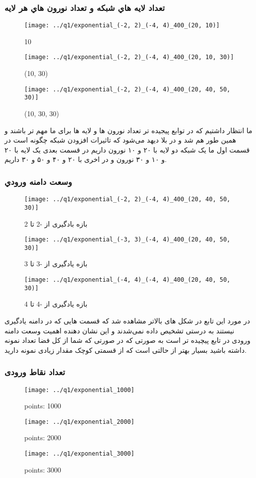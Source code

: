 \documentclass[a4paper,12pt]{article}
\begin{document}
 \subsubsection{تعداد لایه هاي شبکه و تعداد نورون هاي هر لایه}
\begin{figure}[!htb]
  \texttt{[image: ../q1/exponential\_(-2, 2)\_(-4, 4)\_400\_(20, 10)]}
  \caption{10}
\endminipage\hfill
{}
  \texttt{[image: ../q1/exponential\_(-2, 2)\_(-4, 4)\_400\_(20, 10, 30)]}
  \caption{(10, 30)}
\endminipage\hfill
{}
  \texttt{[image: ../q1/exponential\_(-2, 2)\_(-4, 4)\_400\_(20, 40, 50, 30)]}
  \caption{(10, 30, 30)}
\endminipage\hfill
\end{figure}
ما انتظار داشتیم که در توابع پیجیده تر تعداد نورون ها و لایه ها برای ما مهم تر باشند و همین طور هم شد و در بلا دیهد می‌شود که تاثیرات افزودن شبکه چگونه است در قسمت اول ما یک شبکه دو لایه با ۲۰ و ۱۰ نورون داریم در قسمت بعدی یک لایه با  ۲۰ و ۱۰ و ۳۰ نورون و در اخری با ۲۰ و ۴۰ و ۵۰ و ۳۰ داریم.


\newpage
\subsubsection{وسعت دامنه ورودي }
\begin{figure}[!htb]
  \texttt{[image: ../q1/exponential\_(-2, 2)\_(-4, 4)\_400\_(20, 40, 50, 30)]}
  \caption{بازه بادگیری از -2 تا 2}
\endminipage\hfill
{}
  \texttt{[image: ../q1/exponential\_(-3, 3)\_(-4, 4)\_400\_(20, 40, 50, 30)]}
  \caption{بازه یادگیری از -3 تا 3}
\endminipage\hfill
{}
  \texttt{[image: ../q1/exponential\_(-4, 4)\_(-4, 4)\_400\_(20, 40, 50, 30)]}
  \caption{بازه یادگیری از -4 تا 4}
\endminipage
\end{figure}
در مورد این تابع در شکل های بالاتر مشاهده شد که قسمت هایی که در دامنه یادگیری نیستند به درستی تشخیص داده نمی‌شدند و این نشان دهنده اهمیت وسعت دامنه ورودی در تابع پیچیده تر است به صورتی که در صورتی که شما از کل فضا تعداد نمونه داشته باشید بسیار بهتر از حالتی است که از قسمتی کوچک مقدار زیادی نمونه دارید.

\subsubsection{تعداد نقاط ورودی}



\begin{figure}[!htb]
  \texttt{[image: ../q1/exponential\_1000]}
  \caption{points: 1000}
\endminipage\hfill
{}
  \texttt{[image: ../q1/exponential\_2000]}
  \caption{points: 2000}
\endminipage\hfill
{}
  \texttt{[image: ../q1/exponential\_3000]}
  \caption{points: 3000}
\endminipage
\end{figure}
\end{document}
